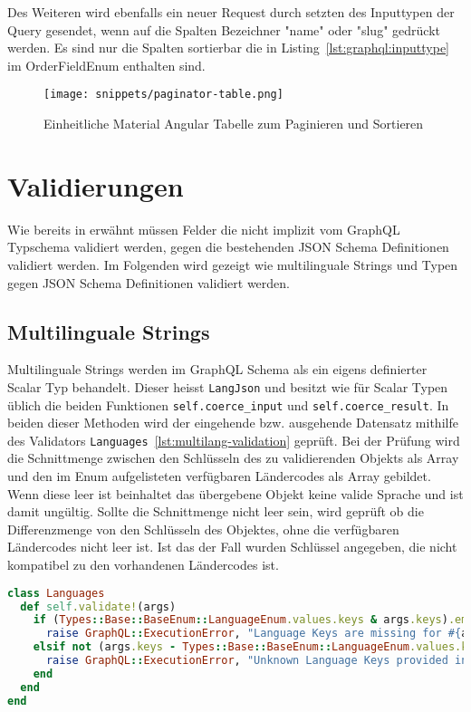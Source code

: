 Des Weiteren wird ebenfalls ein neuer Request durch setzten des Inputtypen der Query gesendet, wenn auf die Spalten Bezeichner "name" oder "slug" gedrückt werden. Es sind nur die Spalten sortierbar die in Listing~\ref{lst:graphql:inputtype} im OrderFieldEnum enthalten sind.

\begin{figure}[h!]
	\centering
	\texttt{[image: snippets/paginator-table.png]}
	\caption{Einheitliche Material Angular Tabelle zum Paginieren und Sortieren}
	\label{impl:graphql:paginator-table}
\end{figure}

\section{Validierungen}
\label{graphql:validation}
Wie bereits in  erwähnt müssen Felder die nicht implizit vom GraphQL Typschema validiert werden, gegen die bestehenden JSON Schema Definitionen validiert werden. Im Folgenden wird gezeigt wie multilinguale Strings und Typen gegen JSON Schema Definitionen validiert werden.

\subsection{Multilinguale Strings}
\label{graphql:validation:multi}
Multilinguale Strings werden im GraphQL Schema als ein eigens definierter Scalar Typ behandelt.
Dieser heisst \lstinline|LangJson| und besitzt wie für Scalar Typen üblich die beiden Funktionen \lstinline|self.coerce_input| und \lstinline|self.coerce_result|. In beiden dieser Methoden wird der eingehende bzw. ausgehende Datensatz mithilfe des Validators \lstinline|Languages|~\ref{lst:multilang-validation} geprüft. 
Bei der Prüfung wird die Schnittmenge zwischen den Schlüsseln des zu validierenden Objekts als Array und den im Enum aufgelisteten verfügbaren Ländercodes als Array gebildet. Wenn diese leer ist beinhaltet das übergebene Objekt keine valide Sprache und ist damit ungültig. Sollte die Schnittmenge nicht leer sein, wird geprüft ob die Differenzmenge von den Schlüsseln des Objektes, ohne die verfügbaren Ländercodes nicht leer ist. Ist das der Fall wurden Schlüssel angegeben, die nicht kompatibel zu den vorhandenen Ländercodes ist. 

\begin{lstlisting}[language=Ruby,float=h!,caption={Validator Klasse zum Prüfen, ob der übergebene Parameter die Beschaffenheit eines multilingualen Strings aufweist. \lstinline|/graphql/validators/languages.rb|}, label={lst:multilang-validation}]
class Languages
  def self.validate!(args)
    if (Types::Base::BaseEnum::LanguageEnum.values.keys & args.keys).empty?
      raise GraphQL::ExecutionError, "Language Keys are missing for #{args}"
    elsif not (args.keys - Types::Base::BaseEnum::LanguageEnum.values.keys).empty?
      raise GraphQL::ExecutionError, "Unknown Language Keys provided in #{args}"
    end
  end
end
\end{lstlisting}

